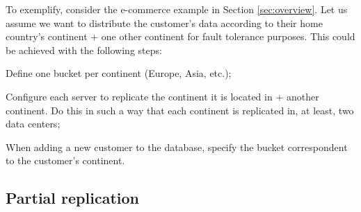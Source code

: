 \documentclass[sigconf, nonacm]{acmart}
\begin{document}
To exemplify, consider the e-commerce example in Section \ref{sec:overview}.
Let us assume we want to distribute the customer's data according to their home country's continent + one other continent for fault tolerance purposes.
This could be achieved with the following steps:

\begin{compactenum}
	\item Define one bucket per continent (Europe, Asia, etc.);
	\item Configure each server to replicate the continent it is located in + another continent. Do this in such a way that each continent is replicated in, at least, two data centers;
	\item When adding a new customer to the database, specify the bucket correspondent to the customer's continent.
\end{compactenum}

\subsection{Partial replication}
\label{subsec:partial}

\end{document}
